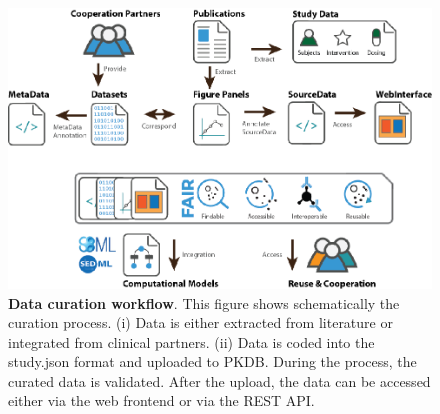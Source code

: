 \documentclass[a4,center,fleqn]{NAR}
\begin{document}
\begin{figure}[t]
\begin{center}
\includegraphics{NAR-fig1.png}
\end{center}
\caption{\textbf{Data curation workflow}. This figure shows schematically the curation process. (i) Data is either extracted from literature or integrated from clinical partners. (ii) Data is coded into the study.json format and uploaded to PKDB. During the process, the curated data is validated. After the upload, the data can be accessed either via the web frontend or via the REST API.}
\label{NAR-fig1}
\end{figure}
\end{document}
